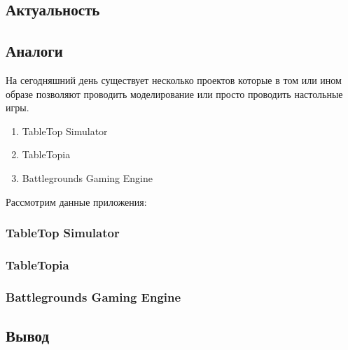 \subsection{Актуальность}
	
\subsection{Аналоги}
	На сегодняшний день существует несколько проектов которые в том или ином образе позволяют проводить моделирование или просто проводить настольные игры.
	\begin{enumerate}
		\item TableTop Simulator
		\item TableTopia
		\item Battlegrounds Gaming Engine
	\end{enumerate}

	Рассмотрим данные приложения:
	
	\subsubsection{TableTop Simulator}
	
	\subsubsection{TableTopia}
	
	\subsubsection{Battlegrounds Gaming Engine}

\subsection{Вывод} 